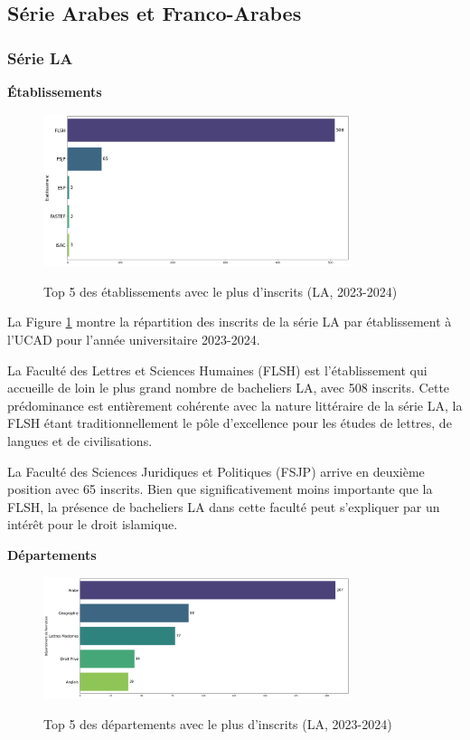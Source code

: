 \subsection{Série Arabes et Franco-Arabes}

\subsubsection{Série LA}

\textbf{Établissements}

\begin{figure}[ht]
\centering
\caption{Top 5 des établissements avec le plus d'inscrits (LA, 2023-2024)}
\includegraphics[width=0.8\textwidth]{figure/etab_LA_2024.png}
\label{fig:etab_la_2024}
\end{figure}

La Figure \ref{fig:etab_la_2024} montre la répartition des inscrits de la série LA par établissement à l'UCAD pour l'année universitaire 2023-2024.

La Faculté des Lettres et Sciences Humaines (FLSH) est l'établissement qui accueille de loin le plus grand nombre de bacheliers LA, avec 508 inscrits. 
Cette prédominance est entièrement cohérente avec la nature littéraire de la série LA, la FLSH étant traditionnellement le pôle d'excellence pour les études de lettres, de langues et de civilisations.

La Faculté des Sciences Juridiques et Politiques (FSJP) arrive en deuxième position avec 65 inscrits. Bien que significativement moins importante que la FLSH, la présence de bacheliers LA dans cette faculté peut s'expliquer par un intérêt pour le droit islamique.

\newpage
\textbf{Départements}

\begin{figure}[ht]
\centering
\caption{Top 5 des départements avec le plus d'inscrits (LA, 2023-2024)}
\includegraphics[width=0.8\textwidth]{figure/dep_LA_2024.png}
\label{fig:dep_la_2024}
\end{figure}

